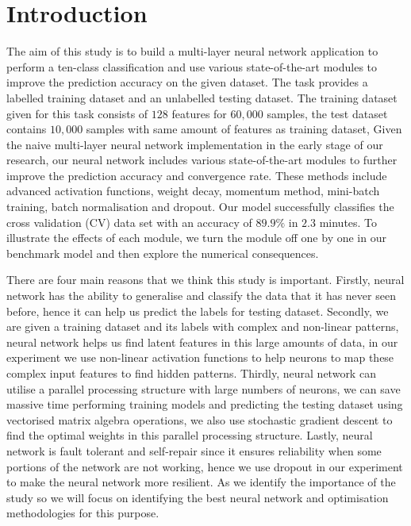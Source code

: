\section{Introduction\label{chapter1}}

The aim of this study is to build a multi-layer neural network application to perform a ten-class classification and use various state-of-the-art modules to improve the prediction accuracy on the given dataset.
The task provides a labelled training dataset and an unlabelled testing dataset.
The training dataset given for this task consists of $128$ features for $60,000$ samples,
the test dataset contains $10,000$ samples with same amount of features as training dataset,
Given the naive multi-layer neural network implementation in the early stage of our research, %
our neural network includes various state-of-the-art modules to further improve the prediction accuracy and convergence rate. These methods include advanced activation functions, 
weight decay, 
momentum method,
mini-batch training, batch normalisation and dropout. 
Our model successfully classifies the cross validation (CV) data set with an accuracy of $89.9\%$ in $2.3$ minutes. 
To illustrate the effects of each module, we turn the module off one by one in our benchmark model and then explore the numerical consequences. 

There are four main reasons that we think this study is important.
Firstly, neural network has the ability to generalise and classify the data that it has never seen before, hence it can help us predict the labels for testing dataset.
Secondly, we are given a training dataset and its labels with complex and non-linear patterns, neural network helps us find latent features in this large amounts of data,
in our experiment we use non-linear activation functions to help neurons to map these complex input features to find hidden patterns. 
Thirdly, neural network can utilise a parallel processing structure with large numbers of neurons, we can save massive time performing training models and predicting the testing dataset using vectorised matrix algebra operations, we also use stochastic gradient descent to find the optimal weights in this parallel processing structure.
Lastly, neural network is fault tolerant and self-repair since it ensures reliability when some portions of the network are not working, hence we use dropout in our experiment to make the neural network more resilient.
As we identify the importance of the study so we will focus on identifying the best neural network and optimisation methodologies for this purpose.

